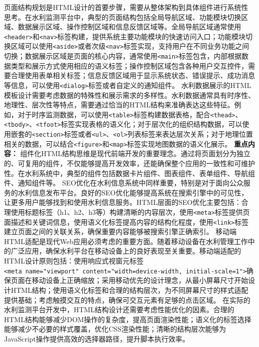 {{页面结构规划是HTML设计的首要步骤，需要从整体架构到具体组件进行系统性思考。在水利监测平台中，典型的页面结构包括全局导航区域、功能模块切换区域、数据展示区域、操作控制区域和信息反馈区域等。全局导航区域通常使用\texttt{\textless{}header\textgreater{}}和\texttt{\textless{}nav\textgreater{}}标签构建，提供系统主要功能模块的快速访问入口；功能模块切换区域可以使用\texttt{\textless{}aside\textgreater{}}或者次级\texttt{\textless{}nav\textgreater{}}标签实现，支持用户在不同业务功能之间切换；数据展示区域是页面的核心内容，通常使用\texttt{\textless{}main\textgreater{}}标签包含，内部根据数据类型和展示方式使用相应的语义标签；操作控制区域包含各种用户交互控件，需要合理使用表单相关标签；信息反馈区域用于显示系统状态、错误提示、成功消息等信息，可以使用\texttt{\textless{}dialog\textgreater{}}标签或者自定义的通知组件。 水利数据展示的HTML模板设计需要考虑数据的特殊性和展示需求的多样性。水利数据通常具有时序性、地理性、层次性等特点，需要通过恰当的HTML结构来准确表达这些特征。例如，对于时序监测数据，可以使用\texttt{\textless{}table\textgreater{}}标签构建数据表格，配合\texttt{\textless{}thead\textgreater{}}、\texttt{\textless{}tbody\textgreater{}}、\texttt{\textless{}tfoot\textgreater{}}标签实现表格的语义化；对于层次化的组织结构数据，可以使用嵌套的\texttt{\textless{}section\textgreater{}}标签或者\texttt{\textless{}ul\textgreater{}}、\texttt{\textless{}ol\textgreater{}}列表标签来表达层次关系；对于地理位置相关的数据，可以结合\texttt{\textless{}figure\textgreater{}}和\texttt{\textless{}map\textgreater{}}标签实现地图数据的语义化展示。 \textbf{重点内容：} 组件化HTML结构思维是现代前端开发的重要理念。通过将页面划分为独立的、可复用的组件，不仅能够提高开发效率，还能确保整个应用的一致性和可维护性。在水利系统中，典型的组件包括数据卡片组件、图表组件、表单组件、导航组件、通知组件等。 SEO优化在水利信息系统中同样重要，特别是对于面向公众服务的水利信息发布平台。良好的SEO优化能够提高系统在搜索引擎中的可见性，让更多用户能够找到和使用水利信息服务。HTML层面的SEO优化主要包括：合理使用标题标签（h1、h2、h3等）构建清晰的内容层次，使用\texttt{\textless{}meta\textgreater{}}标签提供页面描述和关键词信息，使用语义化标签提高内容的结构化程度，使用\texttt{\textless{}link\textgreater{}}标签建立页面之间的关联关系，确保重要内容能够被搜索引擎正确索引。 移动端HTML适配是现代Web应用必须考虑的重要方面。随着移动设备在水利管理工作中的广泛应用，确保水利平台在移动设备上的良好表现至关重要。移动端适配的HTML设计原则包括：使用响应式视窗元标签\texttt{\textless{}meta\ name="viewport"\ content="width=device-width,\ initial-scale=1"\textgreater{}}确保页面在移动设备上正确缩放；采用移动优先的设计理念，从最小屏幕尺寸开始设计HTML结构；使用语义化标签和合理的结构层次，为不同屏幕尺寸的样式适配提供基础；考虑触摸交互的特点，确保可交互元素有足够的点击区域。 在实际的水利监测平台开发中，HTML结构设计还需要考虑性能优化的因素。合理的HTML结构能够减少DOM操作的复杂度，提高页面渲染性能；语义化的标签选择能够减少不必要的样式覆盖，优化CSS渲染性能；清晰的结构层次能够为JavaScript操作提供高效的选择器路径，提升脚本执行效率。 }}
